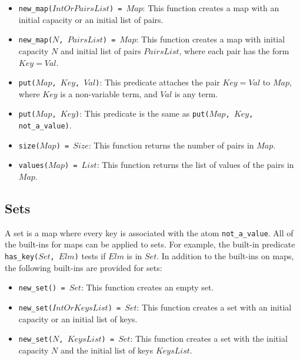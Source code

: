 \begin{itemize}
\item \texttt{new\_map($IntOrPairsList$) = $Map$}: This function creates a map with an initial capacity or an initial list of pairs.
\item \texttt{new\_map($N$, $PairsList$) = $Map$}: This function creates a map with initial capacity $N$ and initial list of pairs $PairsList$, where each pair has the form \texttt{$Key$$=$$Val$}.
\item \texttt{put($Map$, $Key$, $Val$)}: This predicate attaches the pair \texttt{$Key$$=$$Val$} to \texttt{$Map$}, where \texttt{$Key$} is a non-variable term, and \texttt{$Val$} is any term. 
\item \texttt{put($Map$, $Key$)}: This predicate is the same as \texttt{put($Map$, $Key$, not\_a\_value)}.
\item \texttt{size($Map$) = $Size$}: This function returns the number of pairs in $Map$.
\item \texttt{values($Map$) = $List$}: This function returns the list of values of the pairs in $Map$.
\end{itemize}

\subsection{Sets}
A set is a map where every key is associated with the atom \texttt{not\_a\_value}. All of the built-ins for maps can be applied to sets. For example, the built-in predicate \texttt{has\_key($Set$, $Elm$)} tests if $Elm$ is in $Set$. In addition to the built-ins on maps, the following built-ins are provided for sets:
\begin{itemize}
\item \texttt{new\_set() = $Set$}: This function creates an empty set.
\item \texttt{new\_set($IntOrKeysList$) = $Set$}: This function creates a set with an initial capacity or an initial list of keys.
\item \texttt{new\_set($N$, $KeysList$) = $Set$}: This function creates a set with the initial capacity $N$ and the initial list of keys $KeysList$.
\end{itemize}

